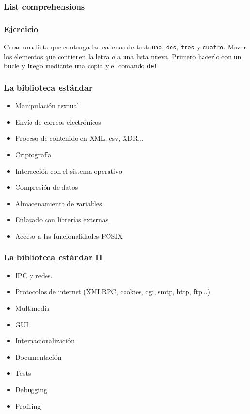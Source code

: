 \documentclass{beamer}
\begin{document}
\begin{frame}
  \frametitle{List comprehensions}
  \testcode
\end{frame}

\begin{frame}
  \frametitle{Ejercicio}
    Crear una lista que contenga las cadenas de texto\texttt{uno},
  \texttt{dos}, \texttt{tres} y \texttt{cuatro}.  Mover los elementos
  que contienen la letra \emph{o} a una lista nueva. Primero hacerlo
  con un bucle y luego mediante una copia y el comando \texttt{del}.
\end{frame}

\begin{frame}
  \frametitle{La biblioteca estándar}
  \begin{itemize}
  \item Manipulación textual
  \item Envío de correos electrónicos
  \item Proceso de contenido en XML, csv, XDR...
  \item Criptografía
  \item Interacción con el sistema operativo
  \item Compresión de datos
  \item Almacenamiento de variables
  \item Enlazado con librerías externas.
  \item Acceso a las funcionalidades POSIX
  \end{itemize}
\end{frame}

\begin{frame}
\frametitle{La biblioteca estándar II}
\begin{itemize}
\item IPC y redes.
  \item Protocolos de internet (XMLRPC, cookies, cgi, smtp, http, ftp...)
  \item Multimedia
  \item GUI
  \item Internacionalización
  \item Documentación
  \item Tests
  \item Debugging
  \item Profiling
\end{itemize}
\end{frame}
\end{document}

